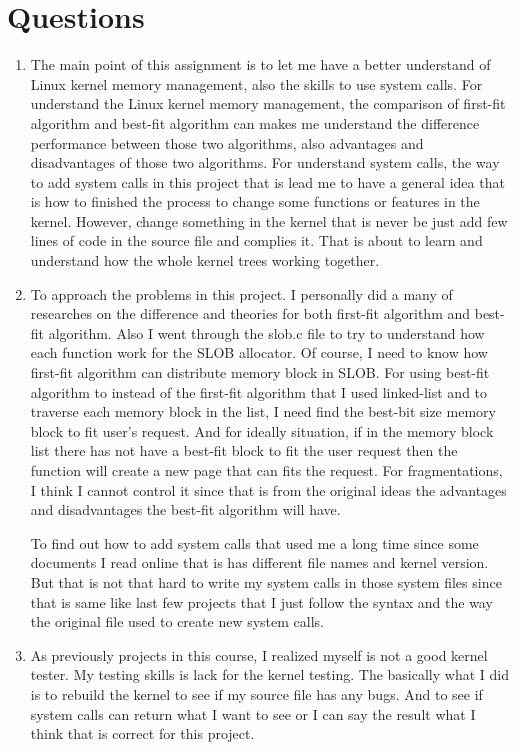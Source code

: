 \documentclass[letterpaper,11pt,titlepage]{article}
\begin{document}
\section{Questions}
\begin{enumerate}

\item The main point of this assignment is to let me have a better understand of Linux kernel memory management, also the skills to use system calls. For understand the Linux kernel memory management, the comparison of first-fit algorithm and best-fit algorithm can makes me understand the difference performance between those two algorithms, also advantages and disadvantages of those two algorithms. For understand system calls, the way to add system calls in this project that is lead me to have a general idea that is how to finished the process to change some functions or features in the kernel. However, change something in the kernel that is never be just add few lines of code in the source file and complies it. That is about to learn and understand how the whole kernel trees working together. 

\item  To approach the problems in this project. I personally did a many of researches on the difference and theories for both first-fit algorithm and best-fit algorithm. Also I went through the slob.c file to try to understand how each function work for the SLOB allocator. Of course, I need to know how first-fit algorithm can distribute memory block in SLOB. For using best-fit algorithm to instead of the first-fit algorithm that I used linked-list and to traverse each memory block in the list, I need find the best-bit size memory block to fit user’s request. And for ideally situation, if in the memory block list there has not have a best-fit block to fit the user request then the function will create a new page that can fits the request. For fragmentations, I think I cannot control it since that is from the original ideas the advantages and disadvantages the best-fit algorithm will have.

To find out how to add system calls that used me a long time since some documents I read online that is has different file names and kernel version. But that is not that hard to write my system calls in those system files since that is same like last few projects that I just follow the syntax and the way the original file used to create new system calls.


\item As previously projects in this course, I realized myself is not a good kernel tester. My testing skills is lack for the kernel testing. The basically what I did is to rebuild the kernel to see if my source file has any bugs. And to see if system calls can return what I want to see or I can say the result what I think that is correct for this project.


\end{enumerate}
\end{document}
